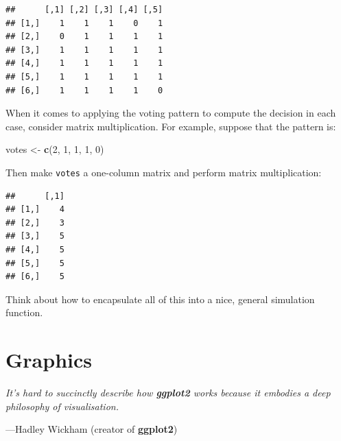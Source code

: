 \documentclass[]{book}
\makeatletter
\newenvironment{Shaded}{\begin{snugshade}}{\end{snugshade}}
\newcommand{\KeywordTok}[1]{\textcolor[rgb]{0.13,0.29,0.53}{\textbf{#1}}}
\newcommand{\DataTypeTok}[1]{\textcolor[rgb]{0.13,0.29,0.53}{#1}}
\newcommand{\DecValTok}[1]{\textcolor[rgb]{0.00,0.00,0.81}{#1}}
\newcommand{\StringTok}[1]{\textcolor[rgb]{0.31,0.60,0.02}{#1}}
\newcommand{\OperatorTok}[1]{\textcolor[rgb]{0.81,0.36,0.00}{\textbf{#1}}}
\newcommand{\NormalTok}[1]{#1}
\newenvironment{kframe}{%
\medskip{}
\setlength{\fboxsep}{.8em}
 \def\at@end@of@kframe{}%
 \ifinner\ifhmode%
  \def\at@end@of@kframe{\end{minipage}}%
  \begin{minipage}{\columnwidth}%
 \fi\fi%
 \def\FrameCommand##1{\hskip\@totalleftmargin \hskip-\fboxsep
 \colorbox{shadecolor}{##1}\hskip-\fboxsep
     \hskip-\linewidth \hskip-\@totalleftmargin \hskip\columnwidth}%
 \MakeFramed {\advance\hsize-\width
   \@totalleftmargin\z@ \linewidth\hsize
   \@setminipage}}%
 {\par\unskip\endMakeFramed%
 \at@end@of@kframe}
\renewenvironment{Shaded}{\begin{kframe}}{\end{kframe}}
\theoremstyle{definition}
\theoremstyle{definition}
\theoremstyle{definition}
\theoremstyle{remark}
\let\BeginKnitrBlock\begin \let\EndKnitrBlock\end
\makeatother
\begin{document}
{\begin{enumerate}
\begin{verbatim}
##      [,1] [,2] [,3] [,4] [,5]
## [1,]    1    1    1    0    1
## [2,]    0    1    1    1    1
## [3,]    1    1    1    1    1
## [4,]    1    1    1    1    1
## [5,]    1    1    1    1    1
## [6,]    1    1    1    1    0
\end{verbatim}

  When it comes to applying the voting pattern to compute the decision
  in each case, consider matrix multiplication. For example, suppose
  that the pattern is:

\begin{Shaded}
\begin{Highlighting}[]
\NormalTok{votes <-}\StringTok{ }\KeywordTok{c}\NormalTok{(}\DecValTok{2}\NormalTok{, }\DecValTok{1}\NormalTok{, }\DecValTok{1}\NormalTok{, }\DecValTok{1}\NormalTok{, }\DecValTok{0}\NormalTok{)}
\end{Highlighting}
\end{Shaded}

  Then make \texttt{votes} a one-column matrix and perform matrix
  multiplication:

\begin{Shaded}
\end{Shaded}

\begin{verbatim}
##      [,1]
## [1,]    4
## [2,]    3
## [3,]    5
## [4,]    5
## [5,]    5
## [6,]    5
\end{verbatim}

  Think about how to encapsulate all of this into a nice, general
  simulation function.
\end{enumerate}

\chapter{Graphics}\label{graphics}

\BeginKnitrBlock{leadquote}
\emph{It's hard to succinctly describe how \textbf{ggplot2} works
because it embodies a deep philosophy of visualisation.}

---Hadley Wickham (creator of \textbf{ggplot2})
\EndKnitrBlock{leadquote}

}
\end{document}
